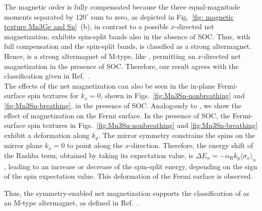 The magnetic order is fully compensated because the three equal-magnitude moments separated by $120^\circ$ sum to zero, as depicted in Fig.~\ref{fig: magnetic texture Mn3Ge and Sn}~(b), in contrast to a possible $x$-directed net magnetization. 
 exhibits spin-split bands also in the absence of SOC. Thus, with full compensation and the spin-split bands,  is classified as a strong altermagnet. 
Hence,  is a strong altermagnet of M-type, like , permitting an $x$-directed net magnetization in the presence of SOC. Therefore, our result agrees with the classification given in Ref.~\cite{Cheong2025}.\\
The effects of the net magnetization can also be seen in the in-plane Fermi-surface spin textures for $k_x=0$, shown in Figs.~\ref{fig:Mn3Sn-nonbreathing} and \ref{fig:Mn3Sn-breathing}, in the presence of SOC. 
Analogously to , we show the effect of magnetization on the Fermi surface.
In the presence of SOC, the Fermi-surface spin textures in Figs.~\ref{fig:Mn3Sn-nonbreathing} and \ref{fig:Mn3Sn-breathing} exhibit a deformation along $k_y$. The mirror symmetry constrains the spins on the mirror plane $k_x=0$ to point along the $x$-direction. Therefore, the energy shift of the Rashba term, obtained by taking its expectation value, is $\Delta E_n=-\alpha_{\mathrm R}k_y\langle\sigma_x\rangle_n$, leading to an increase or decrease of the spin-split energy, depending on the sign of the spin expectation value. This deformation of the Fermi surface is observed.
 
Thus, the symmetry-enabled net magnetization supports the classification of  as an M-type altermagnet, as defined in Ref.~\cite{Cheong2025}.